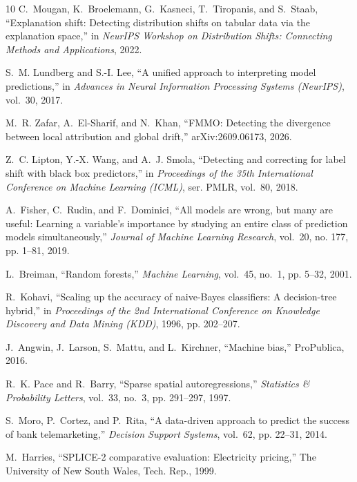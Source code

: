 \documentclass[conference]{IEEEtran}
\theoremstyle{plainhead}
\begin{document}
\begin{thebibliography}{10}
C.~Mougan, K.~Broelemann, G.~Kasneci, T.~Tiropanis, and S.~Staab, ``Explanation
  shift: Detecting distribution shifts on tabular data via the explanation
  space,'' in \emph{NeurIPS Workshop on Distribution Shifts: Connecting Methods
  and Applications}, 2022.

S.~M. Lundberg and S.-I. Lee, ``A unified approach to interpreting model
  predictions,'' in \emph{Advances in Neural Information Processing Systems
  (NeurIPS)}, vol.~30, 2017.

M.~R. Zafar, A.~El-Sharif, and N.~Khan, ``{FMMO}: Detecting the divergence
  between local attribution and global drift,'' arXiv:2609.06173, 2026.

Z.~C. Lipton, Y.-X. Wang, and A.~J. Smola, ``Detecting and correcting for label
  shift with black box predictors,'' in \emph{Proceedings of the 35th
  International Conference on Machine Learning (ICML)}, ser. PMLR, vol.~80,
  2018.

A.~Fisher, C.~Rudin, and F.~Dominici, ``All models are wrong, but many are
  useful: Learning a variable's importance by studying an entire class of
  prediction models simultaneously,'' \emph{Journal of Machine Learning
  Research}, vol.~20, no. 177, pp. 1--81, 2019.

L.~Breiman, ``Random forests,'' \emph{Machine Learning}, vol.~45, no.~1, pp.
  5--32, 2001.

R.~Kohavi, ``Scaling up the accuracy of naive-{B}ayes classifiers: A
  decision-tree hybrid,'' in \emph{Proceedings of the 2nd International
  Conference on Knowledge Discovery and Data Mining (KDD)}, 1996, pp. 202--207.

J.~Angwin, J.~Larson, S.~Mattu, and L.~Kirchner, ``Machine bias,'' ProPublica,
  2016.

R.~K. Pace and R.~Barry, ``Sparse spatial autoregressions,'' \emph{Statistics
  \& Probability Letters}, vol.~33, no.~3, pp. 291--297, 1997.

S.~Moro, P.~Cortez, and P.~Rita, ``A data-driven approach to predict the
  success of bank telemarketing,'' \emph{Decision Support Systems}, vol.~62,
  pp. 22--31, 2014.

M.~Harries, ``{SPLICE-2} comparative evaluation: Electricity pricing,'' The
  University of New South Wales, Tech. Rep., 1999.


\end{thebibliography}
\end{document}
